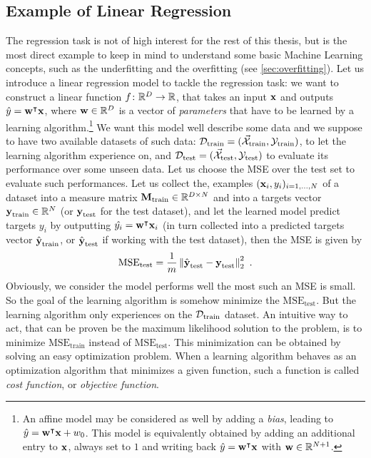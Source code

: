 
\subsection{Example of Linear Regression}
The regression task is not of high interest for the rest of this thesis, but is the most direct example to keep in mind to understand some basic Machine Learning concepts, such as the underfitting and the overfitting (see \ref{sec:overfitting}). Let us introduce a linear regression model to tackle the regression task: we want to construct a linear function $f\colon \mathbb{R}^D \rightarrow \mathbb{R}$, that takes an input $\textbf{x}$ and outputs $\hat{y} = \textbf{w}^\intercal \textbf{x}$, where $\textbf{w}\in \mathbb{R}^D$ is a vector of \emph{parameters} that have to be learned by a learning algorithm.\footnote{An affine model may be considered as well by adding a \emph{bias}, leading to $\hat{y} = \textbf{w}^\intercal \textbf{x}+w_0$. This model is equivalently obtained by adding an additional entry to $\textbf{x}$, always set to $1$ and writing back $\hat{y} = \textbf{w}^\intercal \textbf{x}$ with $\textbf{w}\in \mathbb{R}^{N+1}$. } We want this model well describe some data and we suppose to have two available datasets of such data: $\mathcal{D}_{\text{train}} = (\vec{\mathcal{X}}_{\text{train}}, {\mathcal{Y}}_{\text{train}})$, to let the learning algorithm experience on, and $\mathcal{D}_{\text{test}} = (\vec{\mathcal{X}}_{\text{test}}, {\mathcal{Y}}_{\text{test}})$ to evaluate its performance over some unseen data. Let us choose the MSE over the test set to evaluate such performances. Let us collect the, examples $(\textbf{x}_i, y_i)_{i=1,\dots, N}$ of a dataset into a measure matrix $\textbf{M}_{\text{train}}\in \mathbb{R}^{D \times N}$ and into a targets vector $\textbf{y}_{\text{train}}\in \mathbb{R}^N$ (or $\textbf{y}_\text{test}$ for the test dataset), and let the learned model predict targets $y_i$ by outputting $\hat{y_i} = \textbf{w}^\intercal\textbf{x}_i$ (in turn collected into a predicted targets vector $\hat{\textbf{y}}_{\text{train}}$, or $\hat{\textbf{y}}_{\text{test}}$ if working with the test dataset), then the MSE is given by
\begin{equation}
 \mathrm{MSE_{test}} = \frac{1}{m} \left\lVert\hat{\textbf{y}}_{\text{test}}-\textbf{y}_{\text{test}}\right\rVert^2_2 \mbox{ .}
\end{equation}
Obviously, we consider the model performs well the most such an MSE is small. So the goal of the learning algorithm is somehow minimize the $\mathrm{MSE_{test}}$. But the learning algorithm only experiences on the $\mathcal{D}_{\text{train}}$ dataset. An intuitive way to act, that can be proven be the maximum likelihood solution to the problem, is to minimize  $\mathrm{MSE_{train}}$ instead of $\mathrm{MSE_{test}}$. This minimization can be obtained by solving an easy optimization problem. When a learning algorithm behaves as an optimization algorithm that minimizes a given function, such a function is called \emph{cost function}, or \emph{objective function}.
